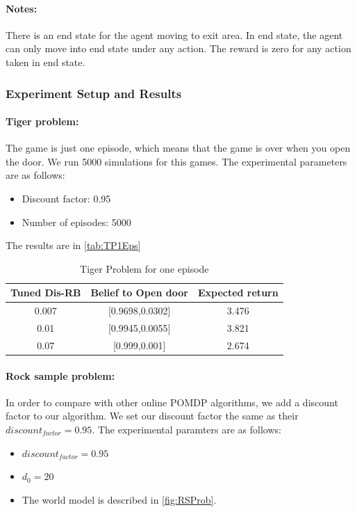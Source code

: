 \documentclass{article}
\begin{document}
\paragraph{Notes:} There is an end state for the agent moving to exit area. In 
end state, the agent can only move into end state under any action. The reward is
zero for any action taken in end state.

\subsubsection{Experiment Setup and Results}

\paragraph{Tiger problem:} The game is just one episode, which means that the game is over
when you open the door. We run 5000 simulations for this games. The experimental parameters
are as follows:
\begin{itemize}
\item Discount factor: 0.95
\item Number of episodes: 5000
\end{itemize}

The results are in \autoref{tab:TP1Eps}

\begin{table}[H] 
\begin{center}
	\begin{tabular} {| c | c | c |}
	\hline \hline
	Tuned Dis-RB & Belief to Open door & Expected return \\
	\hline
	0.007 & [0.9698,0.0302] & 3.476 \\
	\hline
	0.01 & [0.9945,0.0055] & 3.821 \\
	\hline
	0.07 & [0.999,0.001] & 2.674 \\
	\hline \hline
	\end{tabular}
\end{center}
\caption{Tiger Problem for one episode}
\label{tab:TP1Eps}
\end{table}

\paragraph{Rock sample problem:} In order to compare with other online POMDP algorithms,
we add a discount factor to our algorithm. We set our discount factor the same as their 
$discount_{factor}=0.95$. The experimental paramters are as follows:
\begin{itemize}
\item $discount_{factor}=0.95$
\item $d_0=20$
\item The world model is described in \autoref{fig:RSProb}.
\end{itemize}
\end{document}

